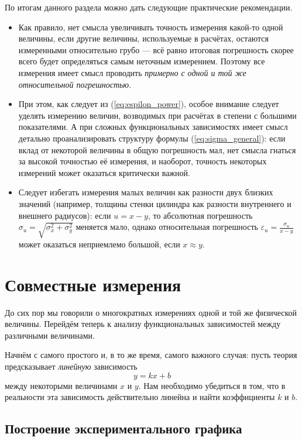 \documentclass[10pt]{article}
\begin{document}
По итогам данного раздела можно дать следующие практические рекомендации.
\begin{itemize}
\item Как правило, нет смысла увеличивать точность измерения какой-то одной
величины, если другие величины, используемые в расчётах, остаются
измеренными относительно грубо --- всё равно итоговая погрешность
скорее всего будет определяться самым неточным измерением. Поэтому
все измерения имеет смысл проводить \emph{примерно с одной и той же
относительной погрешностью}. 
\item При этом, как следует из (\ref{eq:espilon_power}), особое внимание
следует уделять измерению величин, возводимых при расчётах в степени
с большими показателями. А при сложных функциональных зависимостях
имеет смысл детально проанализировать структуру формулы (\ref{eq:sigma_general}):
если вклад от некоторой величины в общую погрешность мал, нет смысла
гнаться за высокой точностью её измерения, и наоборот, точность некоторых
измерений может оказаться критически важной.
\item Следует избегать измерения малых величин как разности двух близких
значений (например, толщины стенки цилиндра как разности внутреннего
и внешнего радиусов): если $u=x-y$, то абсолютная погрешность $\sigma_{u}=\sqrt{\sigma_{x}^{2}+\sigma_{y}^{2}}$
меняется мало, однако относительная погрешность $\varepsilon_{u}=\frac{\sigma_{u}}{x-y}$
может оказаться неприемлемо большой, если $x\approx y$.
\end{itemize}

\section{Совместные измерения}

До сих пор мы говорили о многократных измерениях одной и той же физической
величины. Перейдём теперь к анализу функциональных зависимостей между
различными величинами. 

Начнём с самого простого и, в то же время, самого важного случая:
пусть теория предсказывает \emph{линейную} зависимость
\[
y=kx+b
\]
между некоторыми величинами $x$ и $y$. Нам необходимо убедиться
в том, что в реальности эта зависимость действительно линейна и найти
коэффициенты $k$ и $b$.

\subsection{Построение экспериментального графика}
\end{document}
